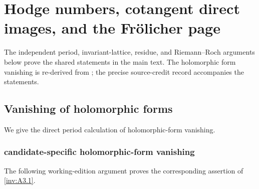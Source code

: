 \section{Hodge numbers, cotangent direct images, and the Fr\"olicher page}
\label{wb:sec:hodge-frolicher}

The independent period, invariant-lattice, residue, and Riemann--Roch
arguments below prove the shared statements in the main text. The holomorphic
form vanishing is re-derived from \citet[Theorem~9.1(vi) and \S9.5]{AC2026};
the precise source-credit record accompanies the statements.

\subsection{Vanishing of holomorphic forms}

We give the direct period calculation of holomorphic-form vanishing.

\subsubsection{candidate-specific holomorphic-form vanishing}\label{inv:wbproof:prop:workbench-holomorphic-form-vanishing}
The following working-edition argument proves the corresponding assertion of \cref{inv:A3.1}.


